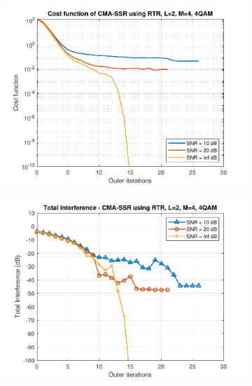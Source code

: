 \begin{figure}
	\centering
	\begin{subfigure}[b]{0.45\textwidth}
		\includegraphics[width=\linewidth]{./figs/BF_RTR_cost_4QAM_L=2_M=4_K=1000.pdf}
		\label{fig:rtr_costqpsk}
	\end{subfigure}
	\begin{subfigure}[b]{0.45\textwidth}
		\includegraphics[width=\linewidth]{./figs/BF_RTR_TI_4QAM_L=2_M=4_K=1000.pdf}
		\label{fig:rtr_ti_qpsk}
	\end{subfigure}\\
	\begin{subfigure}[b]{0.45\textwidth}

\end{subfigure}
\end{figure}
